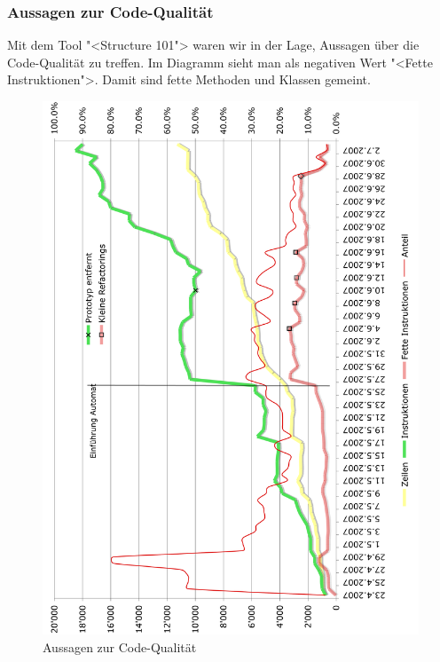 \documentclass[12pt,halfparskip]{scrartcl}
\begin{document}
\subsubsection{Aussagen zur Code-Qualität}
Mit dem Tool "<Structure 101"> waren wir in der Lage, Aussagen über die Code-Qualität zu treffen. Im Diagramm sieht man als negativen Wert "<Fette Instruktionen">. Damit sind fette Methoden und Klassen gemeint.
\begin{figure}[h]
	\centering
	\includegraphics[width=0.8 \textwidth]{code_qualitaet}
	\caption{Aussagen zur Code-Qualität}
	\label{fig:code_qualitaet}
\end{figure}
\end{document}
